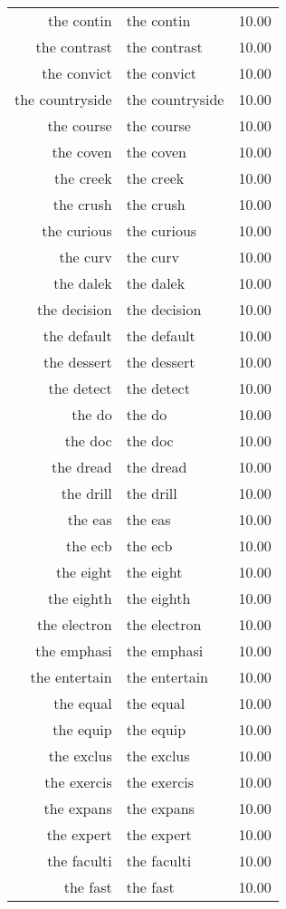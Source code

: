 \begin{table}[ht]
\begin{tabular}{rlr}
  the contin & the contin & 10.00 \\ 
  the contrast & the contrast & 10.00 \\ 
  the convict & the convict & 10.00 \\ 
  the countryside & the countryside & 10.00 \\ 
  the course & the course & 10.00 \\ 
  the coven & the coven & 10.00 \\ 
  the creek & the creek & 10.00 \\ 
  the crush & the crush & 10.00 \\ 
  the curious & the curious & 10.00 \\ 
  the curv & the curv & 10.00 \\ 
  the dalek & the dalek & 10.00 \\ 
  the decision & the decision & 10.00 \\ 
  the default & the default & 10.00 \\ 
  the dessert & the dessert & 10.00 \\ 
  the detect & the detect & 10.00 \\ 
  the do & the do & 10.00 \\ 
  the doc & the doc & 10.00 \\ 
  the dread & the dread & 10.00 \\ 
  the drill & the drill & 10.00 \\ 
  the eas & the eas & 10.00 \\ 
  the ecb & the ecb & 10.00 \\ 
  the eight & the eight & 10.00 \\ 
  the eighth & the eighth & 10.00 \\ 
  the electron & the electron & 10.00 \\ 
  the emphasi & the emphasi & 10.00 \\ 
  the entertain & the entertain & 10.00 \\ 
  the equal & the equal & 10.00 \\ 
  the equip & the equip & 10.00 \\ 
  the exclus & the exclus & 10.00 \\ 
  the exercis & the exercis & 10.00 \\ 
  the expans & the expans & 10.00 \\ 
  the expert & the expert & 10.00 \\ 
  the faculti & the faculti & 10.00 \\ 
  the fast & the fast & 10.00 \\ 

\end{tabular}
\end{table}
